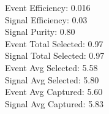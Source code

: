 Event  Efficiency:     0.016\\
Signal Efficiency:     0.03\\
Signal Purity:         0.80\\
Event  Total Selected: 0.97\\
Signal Total Selected: 0.97\\
Event  Avg Selected:   5.58\\
Signal Avg Selected:   5.80\\
Event  Avg Captured:   5.60\\
Signal Avg Captured:   5.83